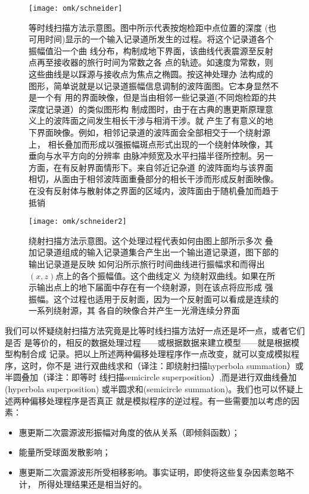 \begin{figure}[H]
\centering
\texttt{[image: omk/schneider]}
\caption[schneider]{等时线扫描方法示意图。图中所示代表按炮检距中点位置的深度
(也可用时间)显示的一个输入记录道所发生的过程。将这个记录道各个振幅值沿一个曲
线分布，构制成地下界面，该曲线代表震源至反射点再至接收器的旅行时间为常数之各
点的轨迹。如速度为常数，则这些曲线是以踩源与接收点为焦点之椭圆。按这神处理办
法构成的图形，简单说就是以记录道振幅信息调制的波阵面图。它本身显然不是一个有
用的界面映像，但是当由相邻一些记录道(不同炮检距的共深度记录道）的类似图形构
制成图时，由于在古典的惠更斯原理意义上的波阵面之间发生相长干涉与相消干涉。就
产生了有意义的地下界面映像。例如，相邻记录道的波阵面会全部相交于一个绕射源上，
相长叠加而形成以强振幅斑点形式出现的一个绕射体映像，其垂向与水平方向的分辨率
由脉冲频宽及水平扫描半径所控制。另一方面，在有反射界面情形下。来自邻近记杂道
的波阵面均与该界面相切，从面由于相邻波阵面重叠部分的相长干涉而形成反射面映像。
在没有反射体与散射体之界面的区域内，波阵面由于随机叠加而趋于抵销}
\label{fig:omk/schneider}
\end{figure}
\begin{figure}[H]
\centering
\texttt{[image: omk/schneider2]}
\caption[schneider2]{绕射扫描方法示意图。这个处理过程代表如何由图上部所示多次
叠加记录道组成的输入记录道集合产生出一个输出道记录道，图下部的输出记录道是反映
如何沿所示旅行时间曲线进行振幅求和而得出$(x,z)$点上的各个振幅值。这个曲线定义
为绕射双曲线。如果在所示输出点上的地下届面中存在有一个绕射源，则在该点将应形成
强振幅。这个过程也适用于反射面，因为一个反射面可以看成是连续的一系列绕射源，其
各自的映像合并产生一光滑连续分界面}
\label{fig:omk/schneider2}
\end{figure}

我们可以怀疑绕射扫描方法究竟是比等时线扫描方法好一点还是坏一点，或者它们是否
是等价的，相反的数据处理过程------或根据数据来建立模型——就是根据模型构制合成
记录。把以上所述两种偏移处理程序作一点改变，就可以变成模拟程序，这时，你不是
进行双曲线求和（译注：即绕射扫描hyperbola summation）或半圆叠加（译注：即等时
线扫描semicircle superposition）,而是进行双曲线叠加(hyperbola superposition)
或半圆求和(semicircle summation)。我们也可以怀疑上述两种偏移处理程序是否真正
就是模拟程序的逆过程。有一些需要加以考虑的因素：
\begin{itemize}
\item 惠更斯二次震源波形振幅对角度的依从关系（即倾斜函数）；
\item 能量所受球面发散影响；
\item 惠更斯二次震源波形所受相移影响。事实证明，即使将这些复杂因素忽略不计，
  所得处理结果还是相当好的。
\end{itemize}


